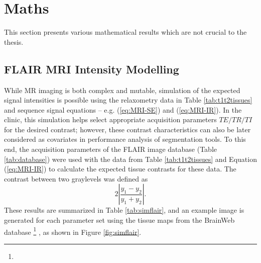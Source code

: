\chapter{Maths}
This section presents various mathematical results which are not crucial to the thesis.
\section{FLAIR MRI Intensity Modelling}\label{s:simflair}
While MR imaging is both complex and mutable, simulation of the expected signal intensities is possible using the relaxometry data in Table \ref{tab:t1t2tissues} and sequence signal equations -- e.g. (\ref{eq:MRI-SE}) and (\ref{eq:MRI-IR}). In the clinic, this simulation helps select appropriate acquisition parameters $TE/TR/TI$ for the desired contrast; however, these contrast characteristics can also be later considered as covariates in performance analysis of segmentation tools. To this end, the acquisition parameters of the FLAIR image database (Table \ref{tab:database}) were used with the data from Table \ref{tab:t1t2tissues} and Equation (\ref{eq:MRI-IR}) to calculate the expected tissue contrasts for these data. The contrast between two graylevels was defined as
\begin{equation}
2\left|\frac{y_1 - y_2}{y_1 + y_2}\right|.
\end{equation}
These results are summarized in Table \ref{tab:simflair}, and an example image is generated for each parameter set using the tissue maps from the BrainWeb database \cite{Collins1998}%
\footnote{}%
, as shown in Figure \ref{fig:simflair}.
